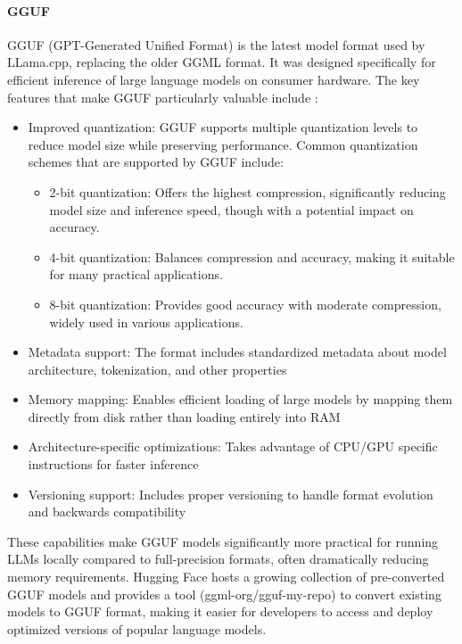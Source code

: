 \paragraph{GGUF}

GGUF (GPT-Generated Unified Format)  is the latest model format used by LLama.cpp, replacing the older GGML format. It was designed specifically for efficient inference of large language models on consumer hardware. The key features that make GGUF particularly valuable include :

\begin{itemize}
    \item Improved quantization: GGUF supports multiple quantization levels to reduce model size while preserving performance. Common quantization schemes that are supported by GGUF include:
    \begin{itemize}
        \item 2-bit quantization: Offers the highest compression, significantly reducing model size and inference speed, though with a potential impact on accuracy.
        \item 4-bit quantization: Balances compression and accuracy, making it suitable for many practical applications.
        \item 8-bit quantization: Provides good accuracy with moderate compression, widely used in various applications.
    \end{itemize}
    \item Metadata support: The format includes standardized metadata about model architecture, tokenization, and other properties
    \item Memory mapping: Enables efficient loading of large models by mapping them directly from disk rather than loading entirely into RAM
    \item Architecture-specific optimizations: Takes advantage of CPU/GPU specific instructions for faster inference
    \item Versioning support: Includes proper versioning to handle format evolution and backwards compatibility
\end{itemize}

These capabilities make GGUF models significantly more practical for running LLMs locally compared to full-precision formats, often dramatically reducing memory requirements. Hugging Face hosts a growing collection of pre-converted GGUF models  and provides a tool (ggml-org/gguf-my-repo) to convert existing models to GGUF format, making it easier for developers to access and deploy optimized versions of popular language models.

